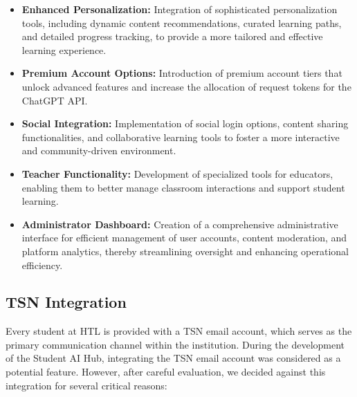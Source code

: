 \begin{itemize}
    \item \textbf{Enhanced Personalization:} Integration of sophisticated personalization tools, including dynamic content recommendations, curated learning paths, and detailed progress tracking, to provide a more tailored and effective learning experience.
    \item \textbf{Premium Account Options:} Introduction of premium account tiers that unlock advanced features and increase the allocation of request tokens for the ChatGPT API.
    \item \textbf{Social Integration:} Implementation of social login options, content sharing functionalities, and collaborative learning tools to foster a more interactive and community-driven environment.
    \item \textbf{Teacher Functionality:} Development of specialized tools for educators, enabling them to better manage classroom interactions and support student learning.
    \item \textbf{Administrator Dashboard:} Creation of a comprehensive administrative interface for efficient management of user accounts, content moderation, and platform analytics, thereby streamlining oversight and enhancing operational efficiency.
\end{itemize}

\subsection{TSN Integration}

Every student at HTL is provided with a TSN email account, which serves as the primary communication channel within the institution. During the development of the Student AI Hub, integrating the TSN email account was considered as a potential feature. However, after careful evaluation, we decided against this integration for several critical reasons:


